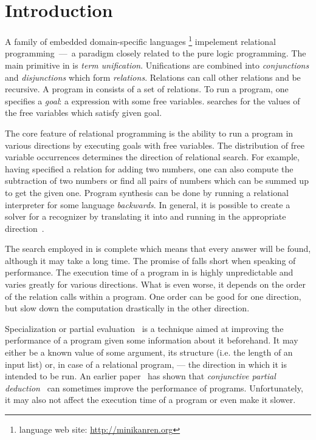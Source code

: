 \section{Introduction}

A family of embedded domain-specific languages \mk\footnote{\mk language web site: \url{http://minikanren.org}} impelement relational programming~---~a paradigm closely related to the pure logic programming.
The main primitive in \mk is \emph{term unification}.
Unifications are combined into \emph{conjunctions} and \emph{disjunctions} which form \emph{relations}.
Relations can call other relations and be recursive.
A program in \mk consists of a set of relations.
To run a \mk program, one specifies a \emph{goal}: a \mk expression with some free variables.
\mk searches for the values of the free variables which satisfy given goal.

The core feature of relational programming is the ability to run a program in various directions by executing goals with free variables.
The distribution of free variable occurrences determines the direction of relational search.
For example, having specified a relation for adding two numbers, one can also compute the subtraction of two numbers or find all pairs of numbers which can be summed up to get the given one.
Program synthesis can be done by running a relational interpreter for some language \emph{backwards}.
In general, it is possible to create a solver for a recognizer by translating it into \mk and running in the appropriate direction~\cite{lozov2019relational}.

The search employed in \mk is complete which means that every answer will be found, although it may take a long time.
The promise of \mk falls short when speaking of performance.
The execution time of a program in \mk is highly unpredictable and varies greatly for various directions.
What is even worse, it depends on the order of the relation calls within a program.
One order can be good for one direction, but slow down the computation drastically in the other direction.

Specialization or partial evaluation~\cite{jonesbook} is a technique aimed at improving the performance of a program given some information about it beforehand.
It may either be a known value of some argument, its structure (i.e. the length of an input list) or, in case of a relational program, --- the direction in which it is intended to be run.
An earlier paper~\cite{lozov2019relational} has shown that \emph{conjunctive partial deduction}~\cite{de1999conjunctive} can sometimes improve the performance of \mk programs.
Unfortunately, it may also not affect the execution time of a program or even make it slower.

